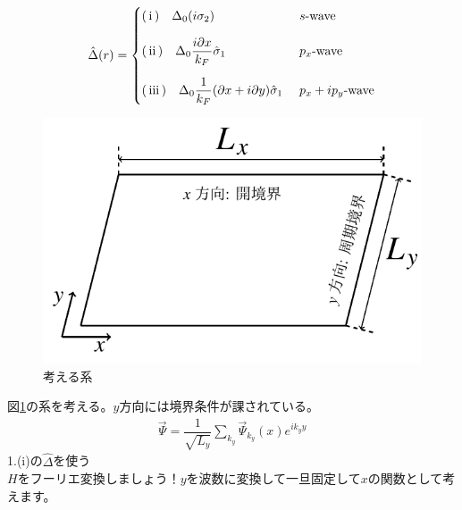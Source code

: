 \documentclass{jarticle}
\begin{document}
\begin{align}
\hat{\Delta}(r)=
\begin{cases}
$\rm(\hspace{.18em}i\hspace{.18em})\quad$\Delta_0(i\sigma_2)
& \mbox{$s$-wave}
\vspace*{1em}\\
$\rm(\hspace{.18em}ii\hspace{.18em})$\quad\Delta_0\dfrac{i\partial x}{k_F}\hat\sigma_1
& \mbox{$p_x$-wave}
\vspace*{1em}\\
$\rm(\hspace{.18em}iii\hspace{.18em})$\quad\Delta_0\dfrac{1}{k_F}(\partial x+i\partial y)\hat\sigma_1\
& \mbox{$p_x+ip_y$-wave}
\end{cases}
\label{delta}
\end{align}
\begin{figure}[H]
	\centering
	\includegraphics[scale=1]{./figure_fix.pdf}
	\caption{考える系}
	\label{system}
\end{figure}
図\ref{system}の系を考える。$y$方向には境界条件が課されている。
\begin{align}
\vec{\Psi}=\dfrac{1}{\sqrt{L_y}}\displaystyle\sum_{k_y}\vec{\Psi}_{k_y}(x)e^{ik_yy}
\end{align}
1.(i)の$\hat{\Delta}$を使う\\		                                               	%
\ding{"AB} $H$をフーリエ変換しましょう！$y$を波数に変換して一旦固定して$x$の関数として考えます。
\end{document}
